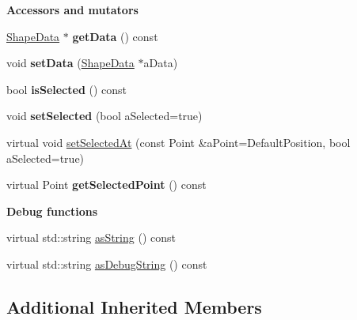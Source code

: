 \begin{Indent}{\bf Accessors and mutators}\par
\begin{DoxyCompactItemize}
\item 
\hyperlink{struct_view_1_1_shape_data}{Shape\+Data} $\ast$ {\bfseries get\+Data} () const \hypertarget{class_view_1_1_shape_a537df4d4736c76092f66d24c1205704d}{}\label{class_view_1_1_shape_a537df4d4736c76092f66d24c1205704d}

\item 
void {\bfseries set\+Data} (\hyperlink{struct_view_1_1_shape_data}{Shape\+Data} $\ast$a\+Data)\hypertarget{class_view_1_1_shape_abc73bac8ae94ccbb8228410367091575}{}\label{class_view_1_1_shape_abc73bac8ae94ccbb8228410367091575}

\item 
bool {\bfseries is\+Selected} () const \hypertarget{class_view_1_1_shape_af9e1799d43f25355d04f95c1f4e75277}{}\label{class_view_1_1_shape_af9e1799d43f25355d04f95c1f4e75277}

\item 
void {\bfseries set\+Selected} (bool a\+Selected=true)\hypertarget{class_view_1_1_shape_a44eacfc99c6a81016afecd06731eedb0}{}\label{class_view_1_1_shape_a44eacfc99c6a81016afecd06731eedb0}

\item 
virtual void \hyperlink{class_view_1_1_shape_aa698e74f91344d0d0dee2c3273c1ec07}{set\+Selected\+At} (const Point \&a\+Point=Default\+Position, bool a\+Selected=true)
\item 
virtual Point {\bfseries get\+Selected\+Point} () const \hypertarget{class_view_1_1_shape_af5616956f613db8a30a65b12914ccd8c}{}\label{class_view_1_1_shape_af5616956f613db8a30a65b12914ccd8c}

\end{DoxyCompactItemize}
\end{Indent}
\begin{Indent}{\bf Debug functions}\par
\begin{DoxyCompactItemize}
\item 
virtual std\+::string \hyperlink{class_view_1_1_shape_a54231a2190a7244fdbd1b66900acf162}{as\+String} () const 
\item 
virtual std\+::string \hyperlink{class_view_1_1_shape_a47a54c2594bad3a5a26ed5aabf9c3f7c}{as\+Debug\+String} () const 
\end{DoxyCompactItemize}
\end{Indent}
\subsection*{Additional Inherited Members}



